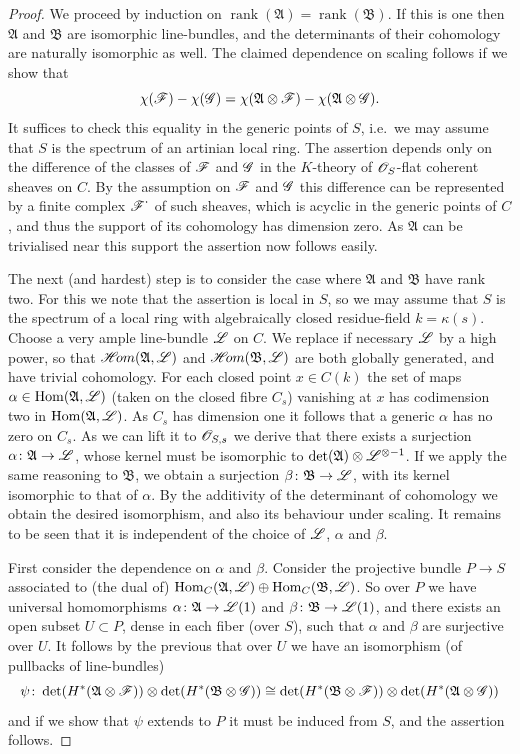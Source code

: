 \documentclass[12pt,english]{smfart}
\newcommand{\Ab}{\mathfrak{A}} \newcommand{\Bb}{\mathfrak{B}} \newcommand{\FA}{\mathfrak{A}} \newcommand{\FB}{\mathfrak{B}} \newcommand{\g}{\mathfrak{g}} \newcommand{\n}{\mathfrak{n}} \newcommand{\h}{\mathfrak{h}} \newcommand{\hh}{\mathfrak{h}} \newcommand{\p}{\mathfrak{p}} \newcommand{\ttt}{\mathfrak{t}} \newcommand{\zz}{\mathfrak{z}} \newcommand{\slt}{\mathfrak{sl}_2} \newcommand{\sltwo}{\mathfrak{sl}_2}
\newcommand{\shHom}{\mathscr{H}\!om} \newcommand{\shEnd}{\mathscr{E}\!nd} \newcommand{\shAut}{\mathfrak{A}ut} \newcommand{\End}{\mathscr{E}\!nd} \newcommand{\Isom}{\mathscr{I}\!som} \newcommand{\Char}{\mathscr{C}\!har} \newcommand{\Conn}{\mathscr{C}\!onn} \newcommand{\Diff}{\mathscr{D}\!iff} \newcommand{\Bor}{\mathscr{B}or} \newcommand{\Flag}{\mathscr{F}\!lag} \renewcommand{\Im}{\mathscr{I}\!m}
\DeclareMathOperator{\Hom}{Hom} \DeclareMathOperator{\Ext}{Ext} \DeclareMathOperator{\Der}{Der} \DeclareMathOperator{\rank}{rank} \DeclareMathOperator{\rk}{rk} \DeclareMathOperator{\Spec}{Spec} \DeclareMathOperator{\depth}{depth} \DeclareMathOperator{\genus}{genus} \DeclareMathOperator{\Lie}{Lie} \DeclareMathOperator{\Ad}{Ad} \DeclareMathOperator{\ad}{ad} \DeclareMathOperator{\id}{id} \DeclareMathOperator{\tr}{tr} \DeclareMathOperator{\ch}{ch} \DeclareMathOperator{\Td}{Td} \DeclareMathOperator{\gr}{gr} \DeclareMathOperator{\Pic}{Pic} \DeclareMathOperator{\Aut}{Aut} \DeclareMathOperator{\Out}{Out} \DeclareMathOperator{\Gal}{Gal} \DeclareMathOperator{\PGL}{PGL} \DeclareMathOperator{\GL}{GL} \DeclareMathOperator{\SL}{SL} \DeclareMathOperator{\Ima}{Im} \newcommand{\HDR}{H_{\mathrm{DR}}} \newcommand{\Mpar}{\sM^{0}_{\theta}(\sG)_{\mathrm{par}}}
\theoremstyle{plain} \newtheorem{innerthm}{Theorem} \newtheorem{innerlem}{Lemma} \newtheorem{innerprop}{Proposition} \newtheorem{innercor}{Corollary} \theoremstyle{definition} \newtheorem{innerdefn}{Definition} \newtheorem{innerconstr}{Construction} \theoremstyle{remark} \newtheorem*{remark}{Remark} \newtheorem*{remarks}{Remarks} \newtheorem*{applications}{Applications}
\begin{document}
\begin{proof}
We proceed by induction on $\rank(\Ab)=\rank(\Bb)$. If this is one then $\Ab$ and $\Bb$ are isomorphic line-bundles, and the determinants of their cohomology are naturally isomorphic as well. The claimed dependence on scaling follows if we show that
\[
\chi(\sF)-\chi(\sG)=\chi(\Ab\otimes\sF)-\chi(\Ab\otimes\sG).
\]
It suffices to check this equality in the generic points of $S$, i.e.\ we may assume that $S$ is the spectrum of an artinian local ring. The assertion depends only on the difference of the classes of $\mathscr{F}$ and $\mathscr{G}$ in the $K$-theory of $\mathscr{O}_S$-flat coherent sheaves on $C$. By the assumption on $\mathscr{F}$ and $\mathscr{G}$ this difference can be represented by a finite complex $\mathscr{F}^{\textstyle\cdot}$ of such sheaves, which is acyclic in the generic points of $C$, and thus the support of its cohomology has dimension zero. As $\Ab$ can be trivialised near this support the assertion now follows easily.

The next (and hardest) step is to consider the case where $\Ab$ and $\Bb$ have rank two. For this we note that the assertion is local in $S$, so we may assume that $S$ is the spectrum of a local ring with algebraically closed residue-field $k=\kappa(s)$. Choose a very ample line-bundle $\mathscr{L}$ on $C$. We replace if necessary $\mathscr{L}$ by a high power, so that $\shHom(\Ab,\sL)$ and $\shHom(\Bb,\sL)$ are both globally generated, and have trivial cohomology. For each closed point $x\in C(k)$ the set of maps $\alpha\in\Hom(\Ab,\sL)$ (taken on the closed fibre $C_s$) vanishing at $x$ has codimension two in $\Hom(\Ab,\sL)$. As $C_s$ has dimension one it follows that a generic $\alpha$ has no zero on $C_s$. As we can lift it to $\mathscr{O}_{S,s}$ we derive that there exists a surjection $\alpha\colon\Ab\to\sL$, whose kernel must be isomorphic to $\det(\Ab)\otimes\sL^{\otimes-1}$. If we apply the same reasoning to $\Bb$, we obtain a surjection $\beta\colon\Bb\to\sL$, with its kernel isomorphic to that of $\alpha$. By the additivity of the determinant of cohomology we obtain the desired isomorphism, and also its behaviour under scaling. It remains to be seen that it is independent of the choice of $\mathscr{L}$, $\alpha$ and $\beta$.

First consider the dependence on $\alpha$ and $\beta$. Consider the projective bundle $P\to S$ associated to (the dual of) $\Hom_C(\Ab,\sL)\oplus\Hom_C(\Bb,\sL)$. So over $P$ we have universal homomorphisms $\alpha\colon\Ab\to\sL(1)$ and $\beta\colon\Bb\to\sL(1)$,
and there exists an open subset $U\subset P$, dense in each fiber (over $S$), such that $\alpha$ and $\beta$ are surjective over $U$. It follows by the previous that over $U$ we have an isomorphism (of pullbacks of line-bundles)
\[
\psi\colon
\det(H^*(\Ab\otimes\sF))\otimes\det(H^*(\Bb\otimes\sG))
\cong
\det(H^*(\Bb\otimes\sF))\otimes\det(H^*(\Ab\otimes\sG))
\]
and if we show that $\psi$ extends to $P$ it must be induced from $S$, and the assertion follows.


\end{proof}
\end{document}
